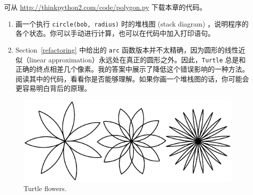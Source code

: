 \begin{exercise}


可从 \href{http://thinkpython2.com/code/polygon.py}{http://thinkpython2.com/code/polygon.py} 下载本章的代码。


\begin{enumerate}

\item 画一个执行 \lstinline{circle(bob, radius)} 时的堆栈图 (stack diagram) ，说明程序的各个状态。你可以手动进行计算，也可以在代码中加入打印语句。

\item Section~\ref{refactoring} 中给出的 \lstinline{arc} 函数版本并不太精确，因为圆形的线性近似（linear approximation）永远处在真正的圆形之外。因此，\lstinline{Turtle} 总是和正确的终点相差几个像素。我的答案中展示了降低这个错误影响的一种方法。阅读其中的代码，看看你是否能够理解。如果你画一个堆栈图的话，你可能会更容易明白背后的原理。

\end{enumerate}

\end{exercise}


\begin{figure}
\centerline
{\includegraphics[scale=0.8]{../source/figs/flowers.pdf}}
\caption{Turtle flowers.}
\label{fig.flowers}
\end{figure}

